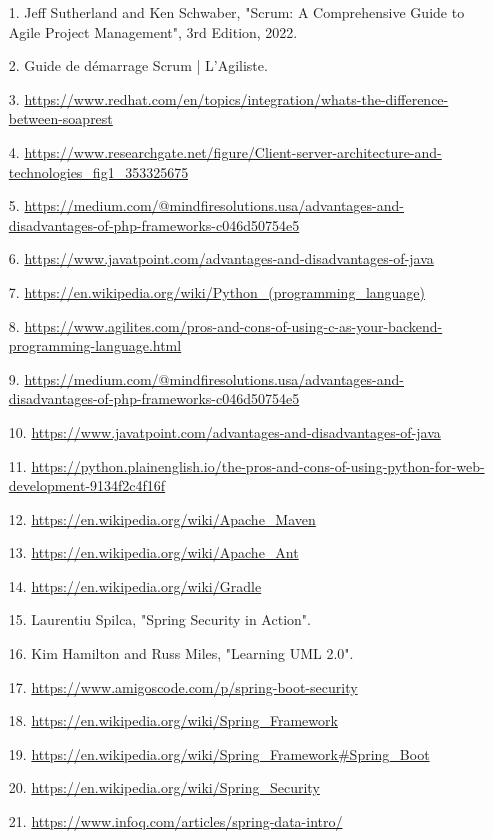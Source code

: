 \documentclass[a4paper, 11pt, openany]{report}
\begin{document}
\begin{itemize}
    \item[1.] Jeff Sutherland and Ken Schwaber, "Scrum: A Comprehensive Guide to Agile Project Management", 3rd Edition, 2022.
    \item[2.] Guide de démarrage Scrum | L'Agiliste.
    \item[3.] \url{https://www.redhat.com/en/topics/integration/whats-the-difference-between-soaprest}
    \item[4.] \url{https://www.researchgate.net/figure/Client-server-architecture-and-technologies_fig1_353325675}
    \item[5.] \url{https://medium.com/@mindfiresolutions.usa/advantages-and-disadvantages-of-php-frameworks-c046d50754e5}
    \item[6.] \url{https://www.javatpoint.com/advantages-and-disadvantages-of-java}
    \item[7.] \url{https://en.wikipedia.org/wiki/Python_(programming_language)}
    \item[8.] \url{https://www.agilites.com/pros-and-cons-of-using-c-as-your-backend-programming-language.html}
    \item[9.] \url{https://medium.com/@mindfiresolutions.usa/advantages-and-disadvantages-of-php-frameworks-c046d50754e5}
    \item[10.] \url{https://www.javatpoint.com/advantages-and-disadvantages-of-java}
    \item[11.] \url{https://python.plainenglish.io/the-pros-and-cons-of-using-python-for-web-development-9134f2c4f16f}
    \item[12.] \url{https://en.wikipedia.org/wiki/Apache_Maven}
    \item[13.] \url{https://en.wikipedia.org/wiki/Apache_Ant}
    \item[14.] \url{https://en.wikipedia.org/wiki/Gradle}
    \item[15.] Laurentiu Spilca, "Spring Security in Action".
    \item[16.] Kim Hamilton and Russ Miles, "Learning UML 2.0".
    \item[17.] \url{https://www.amigoscode.com/p/spring-boot-security}
    \item[18.] \url{https://en.wikipedia.org/wiki/Spring_Framework}
    \item[19.] \url{https://en.wikipedia.org/wiki/Spring_Framework#Spring_Boot}
    \item[20.] \url{https://en.wikipedia.org/wiki/Spring_Security}
    \item[21.] \url{https://www.infoq.com/articles/spring-data-intro/}

\end{itemize}
\end{document}
